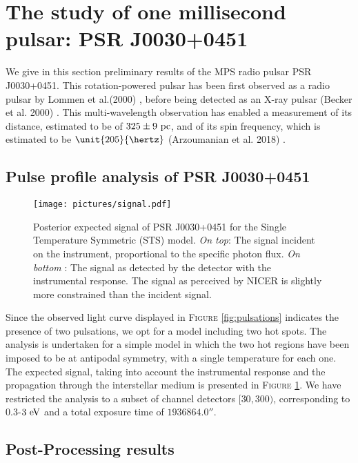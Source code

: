 \documentclass[a4paper, twoside, 12pt]{article}
\numberwithin{equation}{section}
\begin{document}
\section{The study of one millisecond pulsar: PSR J0030+0451 } 
\label{sec: 3}
\hspace{\parindent}	 We give in this section preliminary results of the MPS radio pulsar PSR J0030+0451. This rotation-powered pulsar has been first observed as a radio pulsar by Lommen et al.(2000) \cite{Lorimer+2008}, before being detected as an X-ray pulsar  (Becker et al. 2000) \cite{BeckerPSRJ0030}. This multi-wavelength observation has enabled a measurement of its distance, estimated to be of $325 \pm 9\  \rm{pc} $, and of its spin frequency, which is estimated to be $\unit{205}{\hertz}$ (Arzoumanian et al.
2018) \cite{PSRJ0030}.
\subsection{Pulse profile analysis of PSR J0030+0451 }
\begin{figure}[!h]
\centering
\texttt{[image: pictures/signal.pdf]}
\caption[Posterior expected signal of PSR J0030+0451]{Posterior expected signal of PSR J0030+0451 for the Single Temperature Symmetric (STS) model. {\itshape{On top}}: The signal incident on the instrument, proportional to the specific photon flux. 
{\itshape{On bottom}} : The signal as detected by the detector with the instrumental response. 
The signal as perceived by NICER is slightly more constrained than the incident signal.}
\label{fig: signal_posterior}
\end{figure}

Since the observed light curve displayed in F\textsc{igure} \ref{fig:pulsations} indicates the presence of two pulsations, we opt for a model including two hot spots. The analysis is undertaken for a simple model in which the two hot regions have been imposed to be at antipodal symmetry, with a single temperature for each one.  The expected signal, taking into account the instrumental response and the propagation through the interstellar medium is presented in F\textsc{igure} \ref{fig: signal_posterior}. 
We have restricted the analysis to a subset of channel detectors $[30,300)$, corresponding to $0.3$-$3\ \rm{eV}$ and a total exposure time of $\unit{1936864.0}{\second}$. 

\newpage
\subsection{Post-Processing results}
\end{document}

